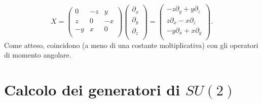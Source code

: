 \documentclass[fleqn,italian]{article}
\theoremstyle{definition}
\theoremstyle{remark}
\theoremstyle{plain}%
\theoremstyle{definition}
\theoremstyle{remark}
\numberwithin{equation}{section}
\numberwithin{thm}{section}
\begin{document}
\begin{equation}
X=\begin{pmatrix} 0 & -z & y \\ z & 0 & -x \\ -y & x & 0 \\ \end{pmatrix}
      \begin{pmatrix} \partial_x \\ \partial_y \\ \partial_z \\ \end{pmatrix}
      = \begin{pmatrix} -z\partial_y+y\partial_z \\ 
                        z\partial_x-x\partial_z \\ 
			-y\partial_x+x\partial_y \\ \end{pmatrix}.
\end{equation}
Come atteso, coincidono (a meno di una costante moltiplicativa) con gli 
operatori di momento angolare.

\section{Calcolo dei generatori di $SU(2)$}
\end{document}
